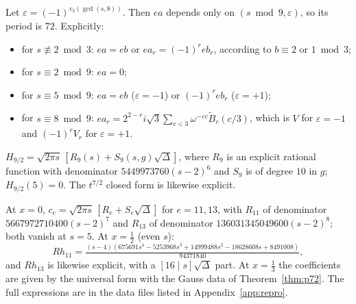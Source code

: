 \begin{theorem}[Period $72$ at $x=\tfrac13$]\label{thm:p72}
Let $\varepsilon=(-1)^{v_2(\gcd(s,8))}$. Then $ea$ depends only on $(s\bmod9,\varepsilon)$, so its period is $72$. Explicitly:
\begin{itemize}[leftmargin=2em]
\item for $s\not\equiv2\bmod3$: $ea=eb$ or $ea_r=(-1)^reb_r$, according to $b\equiv2$ or $1\bmod3$;
\item for $s\equiv2\bmod9$: $ea=0$;
\item for $s\equiv5\bmod9$: $ea=eb$ ($\varepsilon=-1$) or $(-1)^reb_r$ ($\varepsilon=+1$);
\item for $s\equiv8\bmod9$: $ea_r=2^{2-r}i\sqrt3\sum_{c<3}\omega^{-\varepsilon c}\tilde B_r(c/3)$, which is $V$ for $\varepsilon=-1$ and $(-1)^rV_r$ for $\varepsilon=+1$.
\end{itemize}
\end{theorem}
\begin{proposition}[$t^{7/2}$, $t^{9/2}$ at $x=0$]\label{prop:t92}
$H_{9/2}=\sqrt{2\pi s}\,[R_9(s)+S_9(s,g)\sqrt\Delta]$, where $R_9$ is an explicit rational function with denominator $5449973760(s-2)^6$ and $S_9$ is of degree $10$ in $g$; $H_{9/2}(5)=0$.
The $t^{7/2}$ closed form is likewise explicit.
\end{proposition}
\begin{proposition}[$t^{11/2}$, $t^{13/2}$]\label{prop:t1113}
At $x=0$, $c_e=\sqrt{2\pi s}\,[R_e+S_e\sqrt\Delta]$ for $e=11,13$, with $R_{11}$ of denominator $5667972710400(s-2)^7$ and $R_{13}$ of denominator $136031345049600(s-2)^8$; both vanish at $s=5$. At $x=\tfrac12$ (even $s$):
\[Rh_{11}=\tfrac{(s-4)(675691s^4-5253968s^3+14999488s^2-18628608s+8491008)}{94371840},\]
and $Rh_{13}$ is likewise explicit, with a $[16\mid s]\sqrt\Delta$ part. At $x=\tfrac13$ the coefficients are given by the universal form with the Gauss data of Theorem~\ref{thm:p72}. The full expressions are in the data files listed in Appendix~\ref{app:repro}.
\end{proposition}
